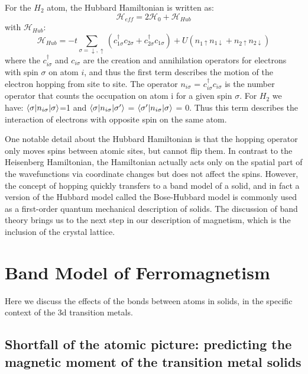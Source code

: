 For the $H_2$ atom, the Hubbard Hamiltonian is written as:
\begin{equation}
\mathscr{H}_{eff}=2\mathscr{H}_0+\mathscr{H}_{Hub}
\end{equation}
with $\mathscr{H}_{Hub}$:
\begin{equation}
\mathscr{H}_{Hub}=-t\sum_{\sigma=\downarrow,\uparrow}(c^{\dagger}_{1\sigma}c_{2\sigma}+c^{\dagger}_{2\sigma}c_{1\sigma}) + U(n_{1\uparrow}n_{1\downarrow}+n_{2\uparrow}n_{2\downarrow})
\end{equation}
where the $c^{\dagger}_{i\sigma}$ and $c_{i\sigma}$ are the creation and annihilation operators for electrons with spin $\sigma$ on atom $i$, and thus the first term describes the motion of the electron hopping from site to site. The operator $n_{i\sigma}$ = $c^{\dagger}_{i\sigma}c_{i\sigma}$ is the number operator that counts the occupation on atom i for a given spin $\sigma$. For $H_2$ we have: $\braket{\sigma|n_{i\sigma}|\sigma}$=1 and $\braket{\sigma|n_{i\sigma}|\sigma'}$ = $\braket{\sigma'|n_{i\sigma}|\sigma}$ = 0. Thus this term describes the interaction of electrons with opposite spin on the same atom.

One notable detail about the Hubbard Hamiltonian is that the hopping operator only moves spins between atomic sites, but cannot flip them. In contrast to the Heisenberg Hamiltonian, the Hamiltonian actually acts only on the spatial part of the wavefunctions via coordinate changes but does not affect the spins. However, the concept of hopping quickly transfers to a band model of a solid, and in fact a version of the Hubbard model called the Bose-Hubbard model is commonly used as a first-order quantum mechanical description of solids. The discussion of band theory brings us to the next step in our description of magnetism, which is the inclusion of the crystal lattice.

\section{Band Model of Ferromagnetism}

Here we discuss the effects of the bonds between atoms in solids, in the specific context of the 3d transition metals.

\subsection{Shortfall of the atomic picture: predicting the magnetic moment of the transition metal solids}

